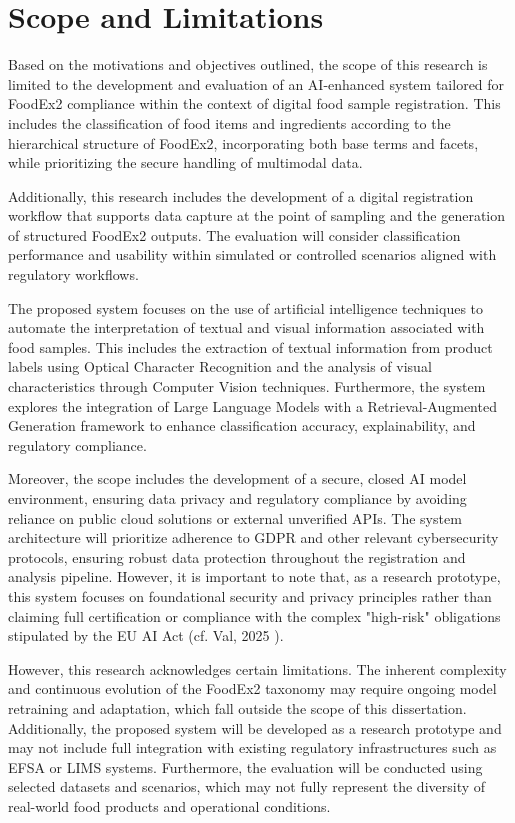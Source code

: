 \hypertarget{scope-and-limitations}{%
\section{Scope and Limitations}\label{scope-and-limitations}}

Based on the motivations and objectives outlined, the scope of this research is limited to the development and evaluation of an AI-enhanced system tailored for FoodEx2 compliance within the context of digital food sample registration. This includes the classification of food items and ingredients according to the hierarchical structure of FoodEx2, incorporating both base terms and facets, while prioritizing the secure handling of multimodal data.

Additionally, this research includes the development of a digital registration workflow that supports data capture at the point of sampling and the generation of structured FoodEx2 outputs. The evaluation will consider classification performance and usability within simulated or controlled scenarios aligned with regulatory workflows.

The proposed system focuses on the use of artificial intelligence techniques to automate the interpretation of textual and visual information associated with food samples. This includes the extraction of textual information from product labels using Optical Character Recognition and the analysis of visual characteristics through Computer Vision techniques. Furthermore, the system explores the integration of Large Language Models with a Retrieval-Augmented Generation framework to enhance classification accuracy, explainability, and regulatory compliance.

Moreover, the scope includes the development of a secure, closed AI model environment, ensuring data privacy and regulatory compliance by avoiding reliance on public cloud solutions or external unverified APIs. The system architecture will prioritize adherence to GDPR and other relevant cybersecurity protocols, ensuring robust data protection throughout the registration and analysis pipeline. However, it is important to note that, as a research prototype, this system focuses on foundational security and privacy principles rather than claiming full certification or compliance with the complex "high-risk" obligations stipulated by the EU AI Act (cf. Val, 2025 \parencite{idse_lucien_val_e2ea81c6}).

However, this research acknowledges certain limitations. The inherent complexity and continuous evolution of the FoodEx2 taxonomy may require ongoing model retraining and adaptation, which fall outside the scope of this dissertation. Additionally, the proposed system will be developed as a research prototype and may not include full integration with existing regulatory infrastructures such as EFSA or LIMS systems. Furthermore, the evaluation will be conducted using selected datasets and scenarios, which may not fully represent the diversity of real-world food products and operational conditions.
